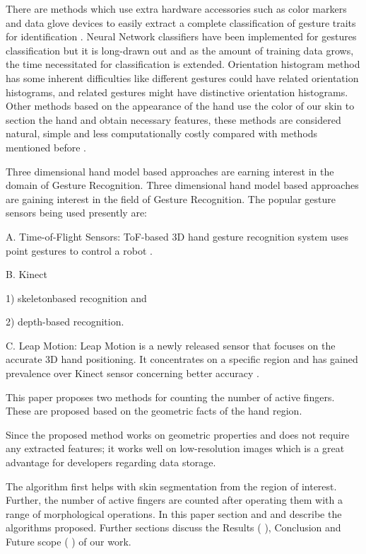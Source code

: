 \documentclass[conference]{IEEEtran}
\newcommand{\RN}[1]{%
  \textup{\uppercase\expandafter{\romannumeral#1}}%
}
\begin{document}
 There are methods which use extra hardware accessories such as color markers and data glove devices to easily extract a complete classification of gesture traits for identification \cite{1199054} . Neural Network classifiers have been implemented for gestures classification \cite{Murakami:1991:GRU:108844.108900} but it is long-drawn out and as the amount of training data grows, the time necessitated for classification is extended. Orientation histogram method \cite{freeman1995orientation} has some inherent difficulties like different gestures could have related orientation histograms, and related gestures might have distinctive orientation histograms. Other methods based on the appearance of the hand use the color of our skin to section the hand and obtain necessary features, these methods are considered natural, simple and less computationally costly compared with methods mentioned before \cite{1199054} .

Three dimensional hand model based approaches \cite{cheng2016survey} are earning interest in the domain of Gesture Recognition. Three dimensional hand model based approaches are gaining interest in the field of Gesture Recognition.
The popular gesture sensors being used presently are:

A. Time-of-Flight Sensors:
ToF-based 3D hand gesture recognition system uses point gestures to control a robot \cite{droeschel2011learning}.

B. Kinect

 1) skeletonbased recognition \cite{shotton2013real} and 
 
 2) depth-based recognition.

C. Leap Motion: Leap Motion is a newly released sensor that focuses on the accurate 3D hand positioning. It concentrates on a specific region and has gained prevalence over Kinect sensor concerning better accuracy \cite{regenbrecht2013leap}.

This paper proposes two methods for counting the number of active fingers. These are proposed based on the geometric facts of the hand region. 

Since the proposed method works on geometric properties and does not require any extracted features; it works well on low-resolution images which is a great advantage for developers regarding data storage.

The algorithm first helps with skin segmentation from the region of interest. Further, the number of active fingers are counted after operating them with a range of morphological operations.
In this paper section \RN{2} and \RN{3} and \RN{4} describe the algorithms proposed. Further sections discuss the Results (\RN{5}), Conclusion and Future scope (\RN{6}) of our work.
\end{document}
